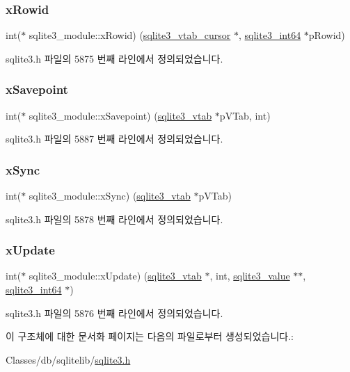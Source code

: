 \subsubsection{\texorpdfstring{x\+Rowid}{xRowid}}
{\footnotesize\ttfamily int($\ast$ sqlite3\+\_\+module\+::x\+Rowid) (\hyperlink{structsqlite3__vtab__cursor}{sqlite3\+\_\+vtab\+\_\+cursor} $\ast$, \hyperlink{sqlite3_8h_a0a4d3e6c1ad46f90e746b920ab6ca0d2}{sqlite3\+\_\+int64} $\ast$p\+Rowid)}



sqlite3.\+h 파일의 5875 번째 라인에서 정의되었습니다.

\mbox{\label{structsqlite3__module_a3819f1935503e558637647c359193ef9}} 
\subsubsection{\texorpdfstring{x\+Savepoint}{xSavepoint}}
{\footnotesize\ttfamily int($\ast$ sqlite3\+\_\+module\+::x\+Savepoint) (\hyperlink{structsqlite3__vtab}{sqlite3\+\_\+vtab} $\ast$p\+V\+Tab, int)}



sqlite3.\+h 파일의 5887 번째 라인에서 정의되었습니다.

\mbox{\label{structsqlite3__module_a3a2dda4b384eef16bf939e3c25df7282}} 
\subsubsection{\texorpdfstring{x\+Sync}{xSync}}
{\footnotesize\ttfamily int($\ast$ sqlite3\+\_\+module\+::x\+Sync) (\hyperlink{structsqlite3__vtab}{sqlite3\+\_\+vtab} $\ast$p\+V\+Tab)}



sqlite3.\+h 파일의 5878 번째 라인에서 정의되었습니다.

\mbox{\label{structsqlite3__module_aa6c44549a07cc5bf36fae44930069ade}} 
\subsubsection{\texorpdfstring{x\+Update}{xUpdate}}
{\footnotesize\ttfamily int($\ast$ sqlite3\+\_\+module\+::x\+Update) (\hyperlink{structsqlite3__vtab}{sqlite3\+\_\+vtab} $\ast$, int, \hyperlink{sqlite3_8h_ac2fa1ecdb2290d9af6010edbd1cbc83c}{sqlite3\+\_\+value} $\ast$$\ast$, \hyperlink{sqlite3_8h_a0a4d3e6c1ad46f90e746b920ab6ca0d2}{sqlite3\+\_\+int64} $\ast$)}



sqlite3.\+h 파일의 5876 번째 라인에서 정의되었습니다.



이 구조체에 대한 문서화 페이지는 다음의 파일로부터 생성되었습니다.\+:\begin{DoxyCompactItemize}
\item 
Classes/db/sqlitelib/\hyperlink{sqlite3_8h}{sqlite3.\+h}\end{DoxyCompactItemize}
